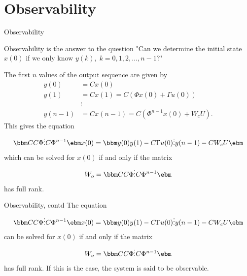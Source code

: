 \documentclass[presentation,aspectratio=1610]{beamer}
\begin{document}
\section{Observability}
\label{sec:org7e5fdb0}
\begin{frame}[label={sec:orgd9c3ab5}]{Observability}
\footnotesize

Observability is the answer to the question "Can we determine the initial state \(x(0)\) if we only know \(y(k), \; k=0,1,2,\ldots, n-1\)?"

The first \(n\) values of the output sequence are given by
\begin{align*}
y(0) &= Cx(0)\\
y(1) &= Cx(1) = C \left( \Phi x(0) + \Gamma u(0)  \right)\\
& \vdots\\
y(n-1) &= Cx(n-1) = C \left( \Phi^{n-1} x(0) + W_c U \right).
\end{align*}
This gives the equation
\[ \bbm C\\C\Phi\\\vdots\\C\Phi^{n-1} \ebm x(0) = \bbm y(0)\\y(1) - C\Gamma u(0)\\\vdots\\ y(n-1) - CW_c U\ebm \]
which can be solved for \(x(0)\) if and only if the matrix 
\[W_o = \bbm C\\C\Phi\\\vdots\\C\Phi^{n-1} \ebm\] has full rank.
\end{frame}

\begin{frame}[label={sec:org3f9df66}]{Observability, contd}
The equation
\[ \bbm C\\C\Phi\\\vdots\\C\Phi^{n-1} \ebm x(0) = \bbm y(0)\\y(1) - C\Gamma u(0)\\\vdots\\ y(n-1) - CW_c U\ebm \]
 can be solved for \(x(0)\) if and only if the matrix 
\[W_o = \bbm C\\C\Phi\\\vdots\\C\Phi^{n-1} \ebm\] has full rank. If this is the case, the system is said to be \alert{observable}.
\end{frame}
\end{document}
